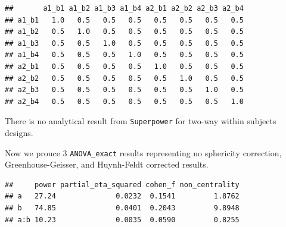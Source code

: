 \documentclass[]{book}
\newenvironment{Shaded}{\begin{snugshade}}{\end{snugshade}}
\newcommand{\CommentTok}[1]{\textcolor[rgb]{0.56,0.35,0.01}{\textit{#1}}}
\newcommand{\DataTypeTok}[1]{\textcolor[rgb]{0.13,0.29,0.53}{#1}}
\newcommand{\KeywordTok}[1]{\textcolor[rgb]{0.13,0.29,0.53}{\textbf{#1}}}
\newcommand{\NormalTok}[1]{#1}
\newcommand{\OperatorTok}[1]{\textcolor[rgb]{0.81,0.36,0.00}{\textbf{#1}}}
\newcommand{\OtherTok}[1]{\textcolor[rgb]{0.56,0.35,0.01}{#1}}
\newcommand{\StringTok}[1]{\textcolor[rgb]{0.31,0.60,0.02}{#1}}
\begin{document}
\begin{verbatim}
##       a1_b1 a1_b2 a1_b3 a1_b4 a2_b1 a2_b2 a2_b3 a2_b4
## a1_b1   1.0   0.5   0.5   0.5   0.5   0.5   0.5   0.5
## a1_b2   0.5   1.0   0.5   0.5   0.5   0.5   0.5   0.5
## a1_b3   0.5   0.5   1.0   0.5   0.5   0.5   0.5   0.5
## a1_b4   0.5   0.5   0.5   1.0   0.5   0.5   0.5   0.5
## a2_b1   0.5   0.5   0.5   0.5   1.0   0.5   0.5   0.5
## a2_b2   0.5   0.5   0.5   0.5   0.5   1.0   0.5   0.5
## a2_b3   0.5   0.5   0.5   0.5   0.5   0.5   1.0   0.5
## a2_b4   0.5   0.5   0.5   0.5   0.5   0.5   0.5   1.0
\end{verbatim}

There is no analytical result from \texttt{Superpower} for two-way within subjects designs.

Now we prouce 3 \texttt{ANOVA\_exact} results representing no sphericity correction, Greenhouse-Geisser, and Huynh-Feldt corrected results.

\begin{Shaded}
\end{Shaded}

\begin{verbatim}
##     power partial_eta_squared cohen_f non_centrality
## a   27.24              0.0232  0.1541         1.8762
## b   74.85              0.0401  0.2043         9.8948
## a:b 10.23              0.0035  0.0590         0.8255
\end{verbatim}

\begin{Shaded}
\end{Shaded}
\end{document}
